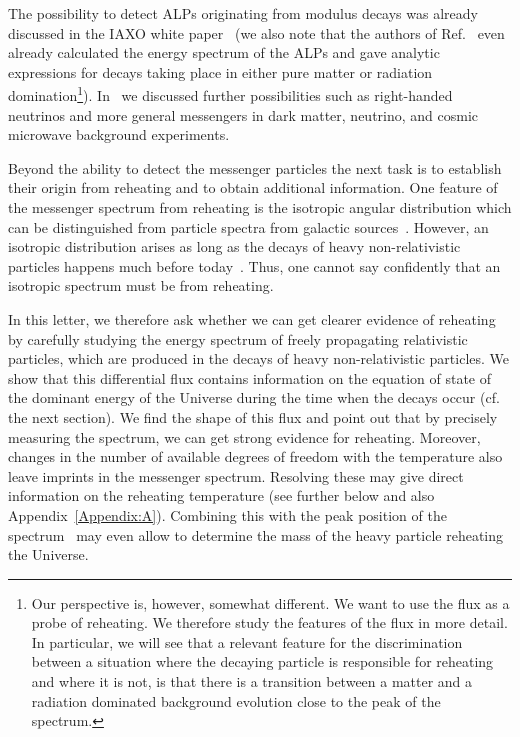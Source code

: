 \documentclass[superscriptaddress,aps,preprintnumbers,amsmath,showpacs,amssymb,prd,nofootinbib,reprint]{revtex4-1}
\begin{document}
The possibility to detect ALPs originating from modulus decays was already discussed in the IAXO white paper~\cite{Armengaud:2019uso} (we also note that the authors of Ref.~\cite{Conlon:2013isa} even already calculated the energy spectrum of the ALPs and gave analytic expressions for decays taking place in either pure matter or radiation domination\footnote{Our perspective is, however, somewhat different. We want to use the flux as a probe of reheating. We therefore study the features of the flux in more detail. In particular, we will see that a relevant feature for the discrimination between a situation where the decaying particle is responsible for reheating and where it is not, is that there is a transition between a matter and a radiation dominated background evolution close to the peak of the spectrum.}). 
In~\cite{Jaeckel:2020oet} we discussed further possibilities such as right-handed neutrinos and more general messengers in dark matter, neutrino, and cosmic microwave background experiments. 

Beyond the ability to detect the messenger particles the next task is to establish their origin from reheating and to obtain additional information.
One feature of the messenger spectrum from reheating is the isotropic angular distribution which can be distinguished from particle spectra from galactic sources~\cite{Conlon:2013isa,Jaeckel:2020oet}.
However, an isotropic distribution arises as long as the decays of heavy non-relativistic particles happens much before today~\cite{Ema:2013nda, Ema:2014ufa}.
Thus, one cannot say confidently that an isotropic spectrum must be from reheating.

In this letter, we therefore ask whether we can get clearer evidence of reheating by 
carefully studying the energy spectrum of freely propagating relativistic particles, which are produced in the decays of heavy non-relativistic particles. We show that this differential flux contains information on the equation of state of the dominant energy of the Universe 
during the time when the decays occur (cf. the next section). We find the shape of this flux and point out that by precisely measuring the spectrum, we can get strong evidence for reheating.
Moreover, changes in the number of available degrees of freedom with the temperature also leave imprints in the messenger spectrum. 
Resolving these may give direct information on the reheating temperature (see further below and also Appendix~\ref{Appendix:A}). Combining this with the peak position of the spectrum~\cite{Jaeckel:2020oet} may even allow to determine the mass of the heavy particle reheating the Universe.
\end{document}
